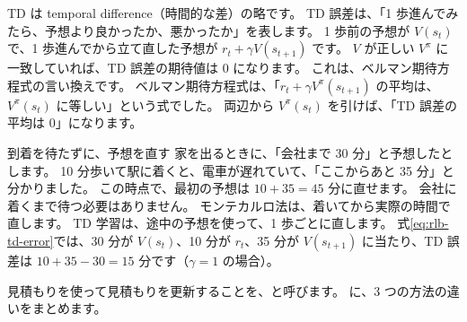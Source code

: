 TD は temporal difference（時間的な差）の略です。
TD 誤差は、「1 歩進んでみたら、予想より良かったか、悪かったか」を表します。
1 歩前の予想が $V(s_t)$ で、1 歩進んでから立て直した予想が $r_t+\gamma V(s_{t+1})$ です。
$V$ が正しい $V^\pi$ に一致していれば、TD 誤差の期待値は 0 になります。
これは、ベルマン期待方程式の言い換えです。
ベルマン期待方程式は、「$r_t+\gamma V^\pi(s_{t+1})$ の平均は、$V^\pi(s_t)$ に等しい」という式でした。
両辺から $V^\pi(s_t)$ を引けば、「TD 誤差の平均は 0」になります。

\begin{intuition}{到着を待たずに、予想を直す}
家を出るときに、「会社まで 30 分」と予想したとします。
10 分歩いて駅に着くと、電車が遅れていて、「ここからあと 35 分」と分かりました。
この時点で、最初の予想は $10+35=45$ 分に直せます。
会社に着くまで待つ必要はありません。
モンテカルロ法は、着いてから実際の時間で直します。
TD 学習は、途中の予想を使って、1 歩ごとに直します。
式\eqref{eq:rlb-td-error}では、30 分が $V(s_t)$、10 分が $r_t$、35 分が $V(s_{t+1})$ に当たり、TD 誤差は $10+35-30=15$ 分です（$\gamma=1$ の場合）。
\end{intuition}

見積もりを使って見積もりを更新することを、と呼びます。
に、3 つの方法の違いをまとめます。

